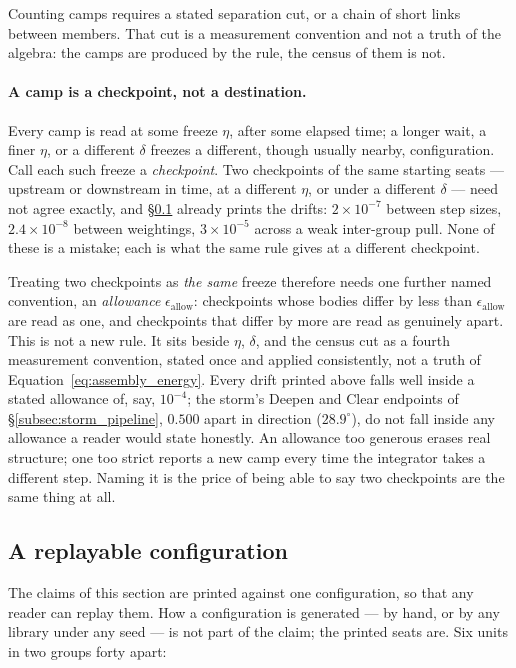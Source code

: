 \documentclass[12pt, a4paper]{article}
\begin{document}
Counting camps requires a stated separation cut, or a chain of short
links between members. That cut is a measurement convention and not
a truth of the algebra: the camps are produced by the rule, the census of them is not.

\paragraph{A camp is a checkpoint, not a destination.}
Every camp is read at some freeze $\eta$, after some elapsed time; a
longer wait, a finer $\eta$, or a different $\delta$ freezes a
different, though usually nearby, configuration. Call each such
freeze a \emph{checkpoint}. Two checkpoints of the same starting
seats --- upstream or downstream in time, at a different $\eta$, or
under a different $\delta$ --- need not agree exactly, and
\S\ref{subsec:enclosure_replay} already prints the drifts: $2\times
10^{-7}$ between step sizes, $2.4\times10^{-8}$ between weightings,
$3\times10^{-5}$ across a weak inter-group pull. None of these is a
mistake; each is what the same rule gives at a different checkpoint.

Treating two checkpoints as \emph{the same} freeze therefore
needs one further named convention, an \emph{allowance}
$\epsilon_{\text{allow}}$: checkpoints whose bodies differ by less
than $\epsilon_{\text{allow}}$ are read as one, and checkpoints that
differ by more are read as genuinely apart. This is not a new rule.
It sits beside $\eta$, $\delta$, and the census cut as a fourth
measurement convention, stated once and applied consistently, not a
truth of Equation~\eqref{eq:assembly_energy}. Every drift printed
above falls well inside a stated allowance of, say, $10^{-4}$; the
storm's Deepen and Clear endpoints of \S\ref{subsec:storm_pipeline},
$0.500$ apart in direction ($28.9^\circ$), do not fall inside any
allowance a reader would state honestly. An allowance too generous
erases real structure; one too strict reports a new camp
every time the integrator takes a different step. Naming it is the
price of being able to say two checkpoints are the same thing at
all.

\subsection{A replayable configuration}
\label{subsec:enclosure_replay}
The claims of this section are printed against one configuration, so
that any reader can replay them. How a configuration is generated ---
by hand, or by any library under any seed --- is not part of the
claim; the printed seats are. Six units in two groups forty apart:
\end{document}
